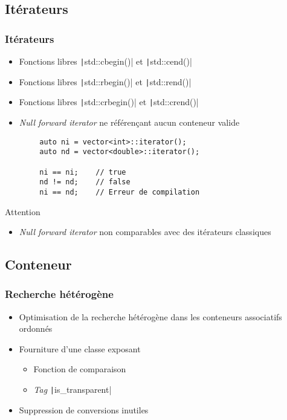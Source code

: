 \documentclass[C++.tex]{subfiles}
\begin{document}
\subsection*{Itérateurs}
\begin{frame}[fragile]
	\frametitle{Itérateurs}
	\begin{itemize}
		\item Fonctions libres \texttt|std::cbegin()| et \texttt|std::cend()|
		\item Fonctions libres \texttt|std::rbegin()| et \texttt|std::rend()|
		\item Fonctions libres \texttt|std::crbegin()| et \texttt|std::crend()|
		\item \textit{Null forward iterator} ne référençant aucun conteneur valide
	\end{itemize}

	\begin{verbatim}
		auto ni = vector<int>::iterator();
		auto nd = vector<double>::iterator();

		ni == ni;    // true
		nd != nd;    // false
		ni == nd;    // Erreur de compilation
	\end{verbatim}

	\begin{alertblock}{Attention}
		\begin{itemize}
			\item \textit{Null forward iterator} non comparables avec des itérateurs classiques
		\end{itemize}
	\end{alertblock}
\end{frame}

\subsection*{Conteneur}
\begin{frame}[fragile]
	\frametitle{Recherche hétérogène}
	\begin{itemize}
		\item Optimisation de la recherche hétérogène dans les conteneurs associatifs ordonnés
		\item Fourniture d'une classe exposant
		\begin{itemize}
			\item Fonction de comparaison
			\item \textit{Tag} \texttt|is_transparent|
		\end{itemize}
		\item Suppression de conversions inutiles
	\end{itemize}
\end{frame}
\end{document}

